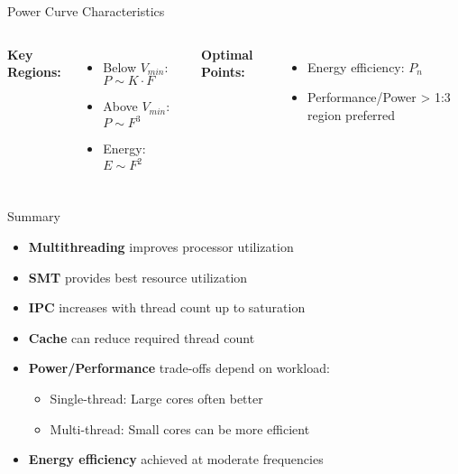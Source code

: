 \documentclass[aspectratio=169,12pt]{beamer}
\begin{document}
\begin{frame}{Power Curve Characteristics}
\begin{columns}

\textbf{Key Regions:}
\begin{itemize}
    \item Below $V_{min}$: $P \sim K \cdot F$
    \item Above $V_{min}$: $P \sim F^3$
    \item Energy: $E \sim F^2$
\end{itemize}

\textbf{Optimal Points:}
\begin{itemize}
    \item Energy efficiency: $P_n$
    \item Performance/Power > 1:3 region preferred
\end{itemize}
\end{columns}
\end{frame}

\begin{frame}{Summary}
\begin{itemize}
    \item \textbf{Multithreading} improves processor utilization
    \item \textbf{SMT} provides best resource utilization
    \item \textbf{IPC} increases with thread count up to saturation
    \item \textbf{Cache} can reduce required thread count
    \item \textbf{Power/Performance} trade-offs depend on workload:
    \begin{itemize}
        \item Single-thread: Large cores often better
        \item Multi-thread: Small cores can be more efficient
    \end{itemize}
    \item \textbf{Energy efficiency} achieved at moderate frequencies
\end{itemize}
\end{frame}
\end{document}
